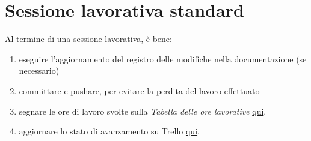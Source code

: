 \chapter{Sessione lavorativa standard}

Al termine di una sessione lavorativa, è bene:
\begin{enumerate}[1.]
\item eseguire l'aggiornamento del registro delle modifiche nella documentazione (se necessario)
\item committare e pushare, per evitare la perdita del lavoro effettuato
\item segnare le ore di lavoro svolte sulla \textit{Tabella delle ore lavorative}
\href{https://docs.google.com/spreadsheets/d/12esX1ISWQOKM-fjuHTLmAzRN0cWltksn7eGiPsBHBI0/edit?usp=sharing}{qui}.
\item aggiornare lo stato di avanzamento su Trello
\href{https://trello.com/b/hIEOGbE9/jawadruids}{qui}.
\end{enumerate}
